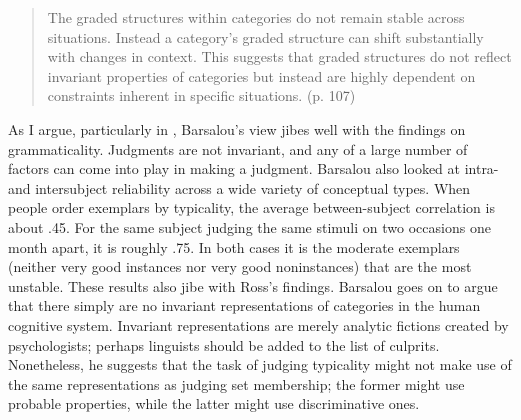 \begin{quote}
The graded structures within categories do not remain stable across situations. Instead a category's graded structure can shift substantially with changes in context. This suggests that graded structures do not reflect invariant properties of categories but instead are highly dependent on constraints inherent in specific situations. (p. 107)
\end{quote}



\noindent
As I argue, particularly in , Barsalou's view jibes well with the findings on grammaticality. Judgments are not invariant, and any of a large number of factors can come into play in making a judgment. Barsalou also looked at intra- and intersubject reliability across a wide variety of conceptual types. When people order exemplars by typicality, the average between-subject correlation is about .45. For the same subject judging the same stimuli on two occasions one month apart, it is roughly .75. In both cases it is the moderate exemplars (neither very good instances nor very good noninstances) that are the most unstable. These results also jibe with Ross's findings. Barsalou goes on to argue that there simply are no invariant representations of categories in the human cognitive system. Invariant representations are merely analytic fictions created by psychologists; perhaps linguists should be added to the list of culprits. Nonetheless, he suggests that the task of judging typicality might not make use of the same representations as judging set membership; the former might use probable properties, while the latter might use discriminative ones.

